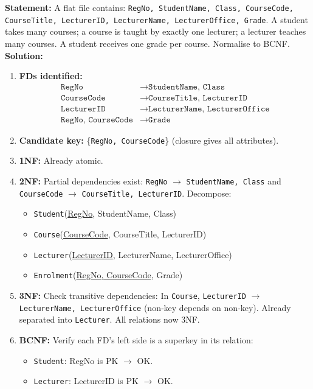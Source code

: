 \documentclass[11pt]{article}
\begin{document}
\begin{exoresolu}
\textbf{Statement:} A flat file contains: \texttt{RegNo, StudentName, Class, CourseCode, CourseTitle, LecturerID, LecturerName, LecturerOffice, Grade}. A student takes many courses; a course is taught by exactly one lecturer; a lecturer teaches many courses. A student receives one grade per course. Normalise to BCNF.
\tcblower
\textbf{Solution:}
\begin{enumerate}
\item \textbf{FDs identified:}
\begin{align*}
\texttt{RegNo} &\rightarrow \texttt{StudentName, Class}\\
\texttt{CourseCode} &\rightarrow \texttt{CourseTitle, LecturerID}\\
\texttt{LecturerID} &\rightarrow \texttt{LecturerName, LecturerOffice}\\
\texttt{RegNo, CourseCode} &\rightarrow \texttt{Grade}
\end{align*}
\item \textbf{Candidate key:} \{\texttt{RegNo, CourseCode}\} (closure gives all attributes).
\item \textbf{1NF:} Already atomic.
\item \textbf{2NF:} Partial dependencies exist: \texttt{RegNo} $\rightarrow$ \texttt{StudentName, Class} and \texttt{CourseCode} $\rightarrow$ \texttt{CourseTitle, LecturerID}. Decompose:
\begin{itemize}
\item \texttt{Student}(\underline{RegNo}, StudentName, Class)
\item \texttt{Course}(\underline{CourseCode}, CourseTitle, LecturerID)
\item \texttt{Lecturer}(\underline{LecturerID}, LecturerName, LecturerOffice)
\item \texttt{Enrolment}(\underline{RegNo, CourseCode}, Grade)
\end{itemize}
\item \textbf{3NF:} Check transitive dependencies: In \texttt{Course}, \texttt{LecturerID} $\rightarrow$ \texttt{LecturerName, LecturerOffice} (non‑key depends on non‑key). Already separated into \texttt{Lecturer}. All relations now 3NF.
\item \textbf{BCNF:} Verify each FD’s left side is a superkey in its relation:
\begin{itemize}
\item \texttt{Student}: RegNo is PK $\rightarrow$ OK.
\item \texttt{Lecturer}: LecturerID is PK $\rightarrow$ OK.

\end{itemize}
\end{enumerate}
\end{exoresolu}
\end{document}
